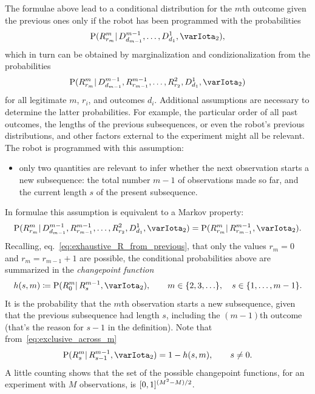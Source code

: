 \documentclass[\ifafour a4paper,12pt,\else a5paper,10pt,\fi%
onecolumn,oneside,article,%
british%
]{memoir}
\theoremstyle{remark}
\theoremstyle{innote}
\newcommand*{\defd}{\coloneqq}
\DeclarePairedDelimiter\clcl{[}{]}
\DeclarePairedDelimiter\set{\{}{\}}
\newcommand*{\p}{\mathrm{P}}%
\renewcommand*{\|}{\mathpunct{|}}
\newcommand*{\eqn}{eq.}%
\newcommand*{\yI}{\varIota}
\newcommand*{\yMc}{\yI_2}
\newcommand*{\yrs}{h}
\begin{document}
The formulae above lead to a conditional distribution for the $m$th outcome
given the previous ones only if the robot has been programmed with the
probabilities
\begin{equation}
  \label{eq:prob_R_conditional_only_data_before}
  \p(R^{m}_{r_{m}} \| D^{m-1}_{d_{m-1}},\dotsc, D^{1}_{d_{1}}, \yMc),
\end{equation}
which in turn can be obtained by marginalization and condizionalization
from the probabilities
\begin{equation}
  \label{eq:prob_R_conditional_before}
  \p(R^{m}_{r_{m}} \| D^{m-1}_{d_{m-1}}, R^{m-1}_{r_{m-1}},\dotsc,
  R^{2}_{r_{2}}, D^{1}_{d_{1}}, \yMc)
\end{equation}
for all legitimate $m$, $r_i$, and outcomes $d_i$. Additional assumptions
are necessary to determine the latter probabilities. For example, the
particular order of all past outcomes, the lengths of the previous
subsequences, or even the robot's previous distributions, and other factors
external to the experiment might all be relevant. The robot is programmed
with this assumption:
\begin{itemize}
\item only two quantities are relevant to infer whether the next
  observation starts a new subsequence: the total number $m-1$ of
  observations made so far, and the current length $s$ of the present
  subsequence.
\end{itemize}
In formulae this assumption is equivalent to a Markov property:
\begin{equation}
  \label{eq:prob_R_markov}
  \p(R^{m}_{r_{m}} \| D^{m-1}_{d_{m-1}}, R^{m-1}_{r_{m-1}},\dotsc,
  R^{2}_{r_{2}}, D^{1}_{d_{1}}, \yMc) =
  \p(R^{m}_{r_{m}} \|  R^{m-1}_{r_{m-1}}, \yMc).
\end{equation}
Recalling, \eqn~\eqref{eq:exhaustive_R_from_previous}, that only the values
$r_{m}=0$ and $r_{m}= r_{m-1}+1$ are possible, the conditional
probabilities above are summarized in the \emph{changepoint function}
\begin{equation}\label{eq:def_changepoint_function}
  \yrs(s,m)  \defd \p(R^{m}_{0} \|  R^{m-1}_{s}, \yMc),
  \qquad m \in\set{2,3,\dotsc}, \quad s\in\set{1,\dotsc,m-1}.
\end{equation}
It is the probability that the $m$th observation starts a new subsequence,
given that the previous subsequence had length $s$, including the $(m-1)$th
outcome (that's the reason for $s-1$ in the definition). Note that
from~\eqref{eq:exclusive_across_m}
\begin{equation}\label{eq:one_minus_h}
  \p(R^{m}_{s} \|  R^{m-1}_{s-1}, \yMc)  = 1-\yrs(s,m),\qquad s\ne 0.
\end{equation}
A little counting shows that the set of the possible changepoint functions,
for an experiment with $M$ observations, is $\clcl{0,1}^{(M^2-M)/2}$.
\end{document}
